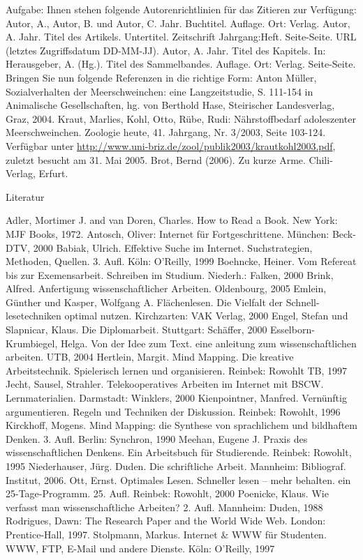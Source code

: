 \documentclass[]{book}
\theoremstyle{definition}
\theoremstyle{definition}
\theoremstyle{definition}
\theoremstyle{remark}
\begin{document}
Aufgabe: Ihnen stehen folgende Autorenrichtlinien für das Zitieren zur
Verfügung: Autor, A., Autor, B. und Autor, C. Jahr. Buchtitel. Auflage.
Ort: Verlag. Autor, A. Jahr. Titel des Artikels. Untertitel. Zeitschrift
Jahrgang:Heft. Seite-Seite. URL (letztes Zugriffsdatum DD-MM-JJ). Autor,
A. Jahr. Titel des Kapitels. In: Herausgeber, A. (Hg.). Titel des
Sammelbandes. Auflage. Ort: Verlag. Seite-Seite. Bringen Sie nun
folgende Referenzen in die richtige Form: Anton Müller, Sozialverhalten
der Meerschweinchen: eine Langzeitstudie, S. 111-154 in Animalische
Gesellschaften, hg. von Berthold Hase, Steirischer Landesverlag, Graz,
2004. Kraut, Marlies, Kohl, Otto, Rübe, Rudi: Nährstoffbedarf
adoleszenter Meerschweinchen. Zoologie heute, 41. Jahrgang, Nr. 3/2003,
Seite 103-124. Verfügbar unter
\url{http://www.uni-briz.de/zool/publik2003/krautkohl2003.pdf}, zuletzt
besucht am 31. Mai 2005. Brot, Bernd (2006). Zu kurze Arme.
Chili-Verlag, Erfurt.

Literatur

Adler, Mortimer J. and van Doren, Charles. How to Read a Book. New York:
MJF Books, 1972. Antosch, Oliver: Internet für Fortgeschrittene.
München: Beck-DTV, 2000 Babiak, Ulrich. Effektive Suche im Internet.
Suchstrategien, Methoden, Quellen. 3. Aufl. Köln: O'Reilly, 1999
Boehncke, Heiner. Vom Refereat bis zur Exemensarbeit. Schreiben im
Studium. Niederh.: Falken, 2000 Brink, Alfred. Anfertigung
wissenschaftlicher Arbeiten. Oldenbourg, 2005 Emlein, Günther und
Kasper, Wolfgang A. Flächenlesen. Die Vielfalt der Schnell-lesetechniken
optimal nutzen. Kirchzarten: VAK Verlag, 2000 Engel, Stefan und
Slapnicar, Klaus. Die Diplomarbeit. Stuttgart: Schäffer, 2000
Esselborn-Krumbiegel, Helga. Von der Idee zum Text. eine anleitung zum
wissenschaftlichen arbeiten. UTB, 2004 Hertlein, Margit. Mind Mapping.
Die kreative Arbeitstechnik. Spielerisch lernen und organisieren.
Reinbek: Rowohlt TB, 1997 Jecht, Sausel, Strahler. Telekooperatives
Arbeiten im Internet mit BSCW. Lernmaterialien. Darmstadt: Winklers,
2000 Kienpointner, Manfred. Vernünftig argumentieren. Regeln und
Techniken der Diskussion. Reinbek: Rowohlt, 1996 Kirckhoff, Mogens. Mind
Mapping: die Synthese von sprachlichem und bildhaftem Denken. 3. Aufl.
Berlin: Synchron, 1990 Meehan, Eugene J. Praxis des wissenschaftlichen
Denkens. Ein Arbeitsbuch für Studierende. Reinbek: Rowohlt, 1995
Niederhauser, Jürg. Duden. Die schriftliche Arbeit. Mannheim:
Bibliograf. Institut, 2006. Ott, Ernst. Optimales Lesen. Schneller lesen
-- mehr behalten. ein 25-Tage-Programm. 25. Aufl. Reinbek: Rowohlt, 2000
Poenicke, Klaus. Wie verfasst man wissenschaftliche Arbeiten? 2. Aufl.
Mannheim: Duden, 1988 Rodrigues, Dawn: The Research Paper and the World
Wide Web. London: Prentice-Hall, 1997. Stolpmann, Markus. Internet \&
WWW für Studenten. WWW, FTP, E-Mail und andere Dienste. Köln: O'Reilly,
1997


\end{document}
